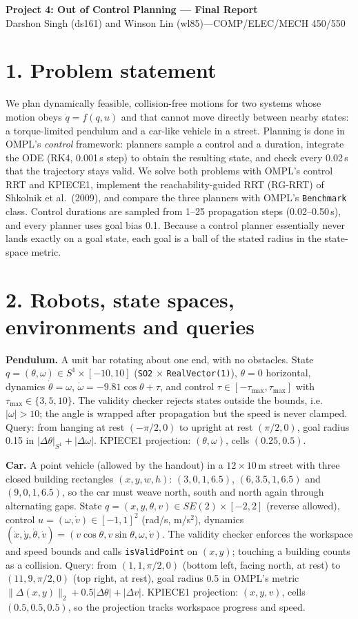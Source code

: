 \documentclass[10pt,letterpaper]{article}
\begin{document}
\begin{center}
{\Large\bfseries Project 4: Out of Control Planning --- Final Report}\\[3pt]
Darshon Singh (ds161) and Winson Lin (wl85)\quad---\quad COMP/ELEC/MECH 450/550
\end{center}

\section*{1. Problem statement}
We plan dynamically feasible, collision-free motions for two systems whose motion obeys $\dot q=f(q,u)$ and that cannot
move directly between nearby states: a torque-limited pendulum and a car-like vehicle in a street. Planning is done in OMPL's
\emph{control} framework: planners sample a control and a duration, integrate the ODE (RK4, 0.001\,s step) to obtain the
resulting state, and check every 0.02\,s that the trajectory stays valid. We solve both problems with OMPL's control RRT and
KPIECE1, implement the reachability-guided RRT (RG-RRT) of Shkolnik et al.\ (2009), and compare the three planners with OMPL's
\texttt{Benchmark} class. Control durations are sampled from 1--25 propagation steps (0.02--0.50\,s), and every planner uses
goal bias 0.1. Because a control planner essentially never lands exactly on a goal state, each goal is a ball of the stated
radius in the state-space metric.

\section*{2. Robots, state spaces, environments and queries}
\textbf{Pendulum.} A unit bar rotating about one end, with no obstacles. State $q=(\theta,\omega)\in S^1\times[-10,10]$
(\texttt{SO2} $\times$ \texttt{RealVector(1)}), $\theta=0$ horizontal, dynamics $\dot\theta=\omega$, $\dot\omega=-9.81\cos\theta+\tau$,
and control $\tau\in[-\tau_{\max},\tau_{\max}]$ with $\tau_{\max}\in\{3,5,10\}$. The validity checker rejects states outside
the bounds, i.e.\ $|\omega|>10$; the angle is wrapped after propagation but the speed is never clamped. Query: from hanging
at rest $(-\pi/2,0)$ to upright at rest $(\pi/2,0)$, goal radius 0.15 in $|\Delta\theta|_{S^1}+|\Delta\omega|$. KPIECE1
projection: $(\theta,\omega)$, cells $(0.25,0.5)$.

\textbf{Car.} A point vehicle (allowed by the handout) in a $12\times10$\,m street with three closed building rectangles
$(x,y,w,h)$: $(3,0,1,6.5)$, $(6,3.5,1,6.5)$ and $(9,0,1,6.5)$, so the car must weave north, south and north again through
alternating gaps. State $q=(x,y,\theta,v)\in SE(2)\times[-2,2]$ (reverse allowed), control $u=(\omega,\dot v)\in[-1,1]^2$
(rad/s, m/s$^2$), dynamics $(\dot x,\dot y,\dot\theta,\dot v)=(v\cos\theta,v\sin\theta,\omega,\dot v)$. The validity checker
enforces the workspace and speed bounds and calls \texttt{isValidPoint} on $(x,y)$; touching a building counts as a collision.
Query: from $(1,1,\pi/2,0)$ (bottom left, facing north, at rest) to $(11,9,\pi/2,0)$ (top right, at rest), goal radius 0.5
in OMPL's metric $\|\Delta(x,y)\|_2+0.5|\Delta\theta|+|\Delta v|$. KPIECE1 projection: $(x,y,v)$, cells $(0.5,0.5,0.5)$,
so the projection tracks workspace progress and speed.
\end{document}

